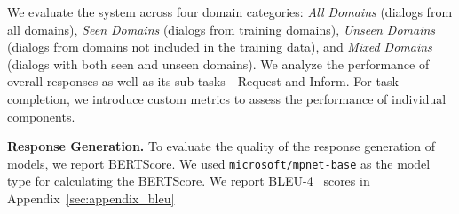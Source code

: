 We evaluate the system across four domain categories: \textit{All Domains} (dialogs from all domains), \textit{Seen Domains} (dialogs from training domains), \textit{Unseen Domains} (dialogs from domains not included in the training data), and \textit{Mixed Domains} (dialogs with both seen and unseen domains).
We analyze the performance of overall responses as well as its sub-tasks---Request and Inform. For task completion, we introduce custom metrics to assess the performance of individual components.






\vspace{4pt}
\noindent
\textbf{Response Generation.}
To evaluate the quality of the response generation of models, we report BERTScore.
We used \texttt{microsoft/mpnet-base} as the model type for calculating the BERTScore. We report BLEU-4~\cite{Papineni2002BleuAM} scores in Appendix~\ref{sec:appendix_bleu}


